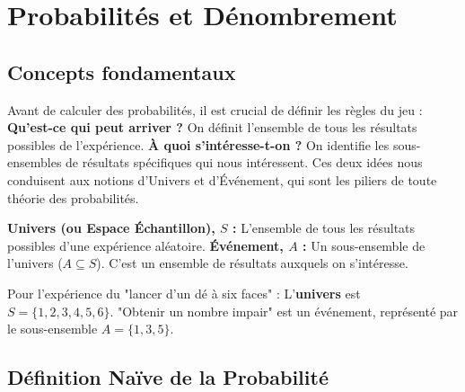 \section{Probabilités et Dénombrement}

\subsection{Concepts fondamentaux}

\begin{intuitionbox}
Avant de calculer des probabilités, il est crucial de définir les règles du jeu :
\newline
\textbf{Qu'est-ce qui peut arriver ?}
\newline
On définit l'ensemble de tous les résultats possibles de l'expérience.
\newline
\textbf{À quoi s'intéresse-t-on ?} 
\newline
On identifie les sous-ensembles de résultats spécifiques qui nous intéressent.
\newline
Ces deux idées nous conduisent aux notions d'Univers et d'Événement, qui sont les piliers de toute théorie des probabilités.
\end{intuitionbox}

\begin{definitionbox}
\textbf{Univers (ou Espace Échantillon), $S$ :} 
\newline
L'ensemble de tous les résultats possibles d'une expérience aléatoire.
\newline
\textbf{Événement, $A$ :} 
\newline
Un sous-ensemble de l'univers ($A \subseteq S$). C'est un ensemble de résultats auxquels on s'intéresse.
\end{definitionbox}

\begin{examplebox}
Pour l'expérience du "lancer d'un dé à six faces" :
\newline
L'\textbf{univers} est $S = \{1, 2, 3, 4, 5, 6\}$.
"Obtenir un nombre impair" est un événement, représenté par le sous-ensemble $A = \{1, 3, 5\}$.
\end{examplebox}

\subsection{Définition Naïve de la Probabilité}

